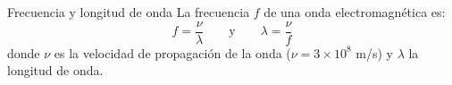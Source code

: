 \begin{infocard}{Frecuencia y longitud de onda}%
    La frecuencia $f$ de una onda electromagnética es:
    \begin{equation}
        f=\frac{\nu}{\lambda}
        \qquad\mathrm{y}\qquad
        \lambda=\frac{\nu}{f}
    \end{equation}
    donde $\nu$ es la velocidad de propagación de la onda ($\nu=3\times 10^{8}$ m/s) y $\lambda$ la longitud de onda.
\end{infocard}%